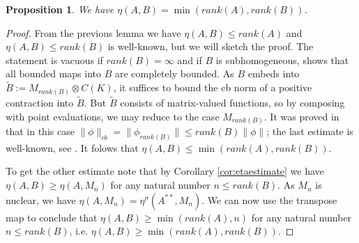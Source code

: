 \documentclass[11pt]{article}
\numberwithin{theorem}{section}
\newtheorem{prop}[theorem]{Proposition}
\begin{document}
\begin{prop}
We have $\eta(A,B) = \min(rank(A), rank(B))$.
\end{prop}
\begin{proof}
From the previous lemma we have $\eta(A,B) \leqslant rank(A)$ and $\eta(A,B) \leqslant rank(B)$ is well-known, but we will sketch the proof. The statement is vacuous if $rank(B) = \infty$ and if $B$ is subhomogeneous, \cite[Theorem 2.1]{MR723470} shows that all bounded maps into $B$ are completely bounded. As $B$ embeds into $\widetilde{B}:=M_{rank(B)} \otimes C(K)$, it suffices to bound the cb norm of a positive contraction into $\widetilde{B}$. But $\widetilde{B}$ consists of matrix-valued functions, so by composing with point evaluations, we may reduce to the case $M_{rank(B)}$. It was proved in \cite[Theorem 2.10]{Smithcb} that in this case $\|\phi\|_{cb} = \|\phi_{rank(B)}\| \leqslant rank(B) \|\phi\|$; the last estimate is well-known, see \cite[Exercise 3.10, Exercise 3.11]{paulsen-book}. It folows that $\eta(A,B) \leqslant \min(rank(A), rank(B))$.

To get the other estimate note that by Corollary \ref{cor:etaestimate} we have $\eta(A,B) \geqslant \eta(A, M_n)$ for any natural number $n\leqslant rank(B)$. As $M_n$ is nuclear, we have $\eta(A, M_n) = \eta^{\sigma}(A^{\ast\ast}, M_n)$. We can now use the transpose map to conclude that $\eta(A,B) \geqslant \min(rank(A), n)$ for any natural number $n\leqslant rank(B)$, i.e. $\eta(A,B) \geqslant \min(rank(A), rank(B))$.

\end{proof}
\end{document}
